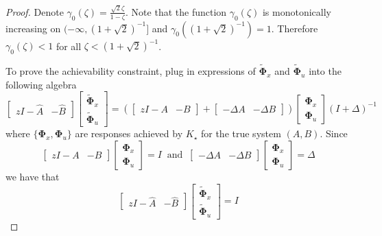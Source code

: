 \documentclass{article}[12pt]
\begin{document}
\begin{proof}
Denote $\gamma_{0}(\zeta)=\frac{\sqrt{2} \zeta}{1-\zeta}$. Note that the function $\gamma_{0}(\zeta)$ is monotonically increasing on $(-\infty,(1+\sqrt{2})^{-1}]$ and $\gamma_{0}((1+\sqrt{2})^{-1}) = 1$. Therefore $\gamma_{0}(\zeta) < 1$ for all $\zeta < (1+\sqrt{2})^{-1}$.

To prove the achievability constraint, plug in expressions of $\tilde{\mathbf{\Phi}}_{x}$ and $\tilde{\mathbf{\Phi}}_{u}$ into the following algebra
\begin{equation}
    \left[\begin{array}{ll}{z I-\hat{A}} & {-\hat{B}}\end{array}\right]\left[\begin{array}{l}{\tilde{\mathbf{\Phi}}_{x}} \\ {\tilde{\mathbf{\Phi}}_{u}}\end{array}\right]= \left(\left[\begin{array}{ll}{z I-A} & {-B}\end{array}\right] + \left[\begin{array}{ll}{-\Delta A} & {-\Delta B}\end{array}\right]\right) \left[\begin{array}{l}{\mathbf{\Phi}_{x}} \\ {\mathbf{\Phi}_{u}}\end{array}\right] (I+\Delta)^{-1} 
\end{equation}
where $\{\mathbf{\Phi}_{x},\mathbf{\Phi}_{u}\}$ are responses achieved by $K_\star$ for the true system $(A,B)$. Since
\begin{equation}
    \left[\begin{array}{ll}{z I-A} & {-B}\end{array}\right]\left[\begin{array}{l}{\mathbf{\Phi}_{x}} \\ {\mathbf{\Phi}_{u}}\end{array}\right]= I \ \text{  and  } \ \left[\begin{array}{ll}{-\Delta A} & {-\Delta B}\end{array}\right] \left[\begin{array}{l}{\mathbf{\Phi}_{x}} \\ {\mathbf{\Phi}_{u}}\end{array}\right] = \Delta
\end{equation}
we have that
\begin{equation}
    \left[\begin{array}{ll}{z I-\hat{A}} & {-\hat{B}}\end{array}\right]\left[\begin{array}{l}{\tilde{\mathbf{\Phi}}_{x}} \\ {\tilde{\mathbf{\Phi}}_{u}}\end{array}\right]= I
\end{equation}


\end{proof}
\end{document}
